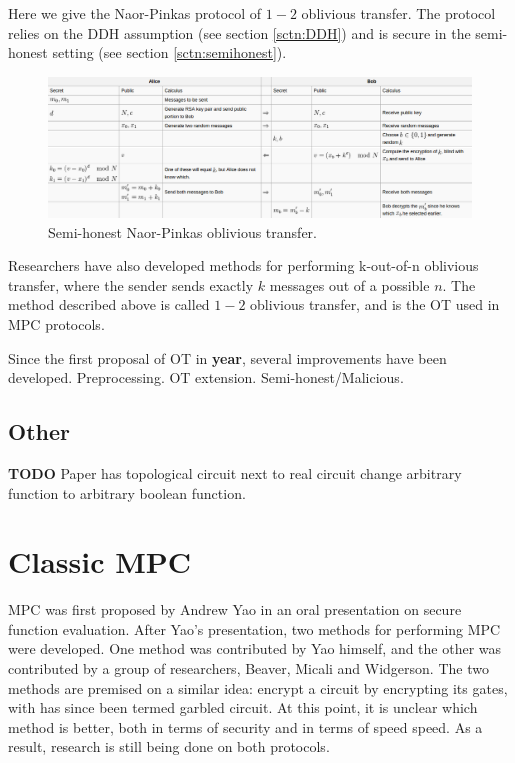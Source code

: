 \documentclass[12pt,twoside]{reedthesis}
\begin{document}
Here we give the Naor-Pinkas protocol of $1-2$ oblivious transfer.
The protocol relies on the DDH assumption (see section \ref{sctn:DDH}) and is secure in the semi-honest setting (see section \ref{sctn:semihonest}).

\begin{figure}
    \centering
    \includegraphics[scale=0.3]{images/ot_wiki}
    \caption{Semi-honest Naor-Pinkas oblivious transfer.}
\end{figure}

Researchers have also developed methods for performing k-out-of-n oblivious transfer, where the sender sends exactly $k$ messages out of a possible $n$.
The method described above is called $1-2$ oblivious transfer, and is the OT used in MPC protocols.

Since the first proposal of OT in \textbf{year}, several improvements have been developed.
Preprocessing.
OT extension.
Semi-honest/Malicious.

\subsection{Other}
\textbf{TODO}
Paper has topological circuit next to real circuit
change arbitrary function to arbitrary boolean function.

\section{Classic MPC}
MPC was first proposed by Andrew Yao in an oral presentation on secure function evaluation.
After Yao's presentation, two methods for performing MPC were developed.
One method was contributed by Yao himself, and the other was contributed by a group of researchers, Beaver, Micali and Widgerson.
The two methods are premised on a similar idea: encrypt a circuit by encrypting its gates, with has since been termed garbled circuit.
At this point, it is unclear which method is better, both in terms of security and in terms of speed speed. 
As a result, research is still being done on both protocols.
\end{document}
